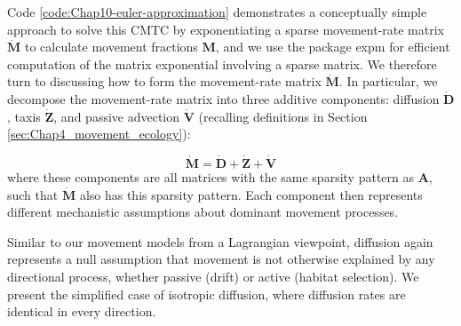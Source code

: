 \lstset{style=Rcode}
 

Code \ref{code:Chap10-euler-approximation} demonstrates a conceptually simple approach to solve this CMTC by exponentiating a sparse movement-rate matrix \(\dot{\mathbf{M}}\) to calculate movement fractions \(\mathbf{M}\), and we use the package \colorbox{backcolour}{expm} \cite{maechler_expm_2023} for efficient computation of the matrix exponential involving a sparse matrix.  We therefore turn to discussing how to form the movement-rate matrix \(\dot{\mathbf{M}}\).  In particular, we decompose the movement-rate matrix into three additive components:  diffusion \(\dot{\mathbf{D}}\), taxis \(\dot{\mathbf{Z}}\), and passive advection \(\dot{\mathbf{V}}\) (recalling definitions in Section \ref{sec:Chap4_movement_ecology}):

\begin{equation}
    \dot{\mathbf{M}} = \dot{\mathbf{D}} + \dot{\mathbf{Z}} + \dot{\mathbf{V}}    
\end{equation}
where these components are all matrices with the same sparsity pattern as \(\mathbf A\), such that \(\dot{\mathbf{M}}\) also has this sparsity pattern.  Each component then represents different mechanistic assumptions about dominant movement processes.  

Similar to our movement models from a Lagrangian viewpoint, diffusion again represents a null assumption that movement is not otherwise explained by any directional process, whether passive (drift) or active (habitat selection).  We present the simplified case of isotropic diffusion, where diffusion rates are identical in every direction. 

